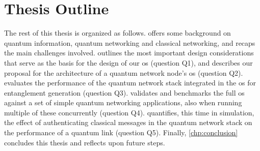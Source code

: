 \section{Thesis Outline}

The rest of this thesis is organized as follows.  offers some background on
quantum information, quantum networking and classical networking, and recaps the main challenges
involved.  outlines the most important design considerations that serve as the basis
for the design of our \acrshort{os} (question Q1), and describes our proposal for the architecture
of a quantum network node's \acrshort{os} (question Q2).  evaluates the
performance of the quantum network stack integrated in the \acrshort{os} for entanglement generation
(question Q3).  validates and benchmarks the full \acrshort{os} against a set of
simple quantum networking applications, also when running multiple of these concurrently (question
Q4).  quantifies, this time in simulation, the effect of authenticating classical
messages in the quantum network stack on the performance of a quantum link (question Q5). Finally,
\cref{chp:conclusion} concludes this thesis and reflects upon future steps.

\printbibliography[heading=subbibintoc,title={References},notcategory=noprint]
